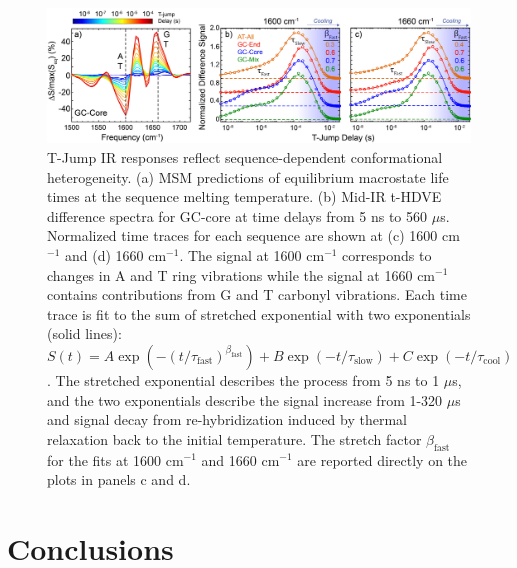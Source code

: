 \documentclass[journal=jpcbfk,manuscript=article]{achemso}
\begin{document}
\begin{figure}[ht!]
	\begin{center} 
        \includegraphics[width=1.0\textwidth]{Fig5.pdf}
        \caption{T-Jump IR responses reflect sequence-dependent conformational heterogeneity. (a) MSM predictions of equilibrium macrostate life times at the sequence melting temperature. (b) Mid-IR t-HDVE difference spectra for GC-core at time delays from 5 ns to 560 $\mu$s. Normalized time traces for each sequence are shown at (c) 1600 cm$^{-1}$ and (d) 1660 cm$^{-1}$. The signal at 1600 cm$^{-1}$ corresponds to changes in A and T ring vibrations while the signal at 1660 cm$^{-1}$ contains contributions from G and T carbonyl vibrations. Each time trace is fit to the sum of stretched exponential with two exponentials (solid lines): $S(t) = A\exp{(-(t/\tau_{\mathrm{fast}})^{\beta_\mathrm{fast}})} + B\exp{(-t/\tau_{\mathrm{slow}})}+C\exp{(-t/\tau_{\mathrm{cool}})}$. The stretched exponential describes the process from 5 ns to 1 $\mu$s, and the two exponentials describe the signal increase from 1-320 $\mu$s and signal decay from re-hybridization induced by thermal relaxation back to the initial temperature. The stretch factor $\beta_\mathrm{fast}$ for the fits at 1600 cm$^{-1}$ and 1660 cm$^{-1}$ are reported directly on the plots in panels c and d.
        }
        \label{fig:T-jump_stretching}
	\end{center}
\end{figure}

   
 
   


\section{\label{sec:conc}Conclusions}
\end{document}
